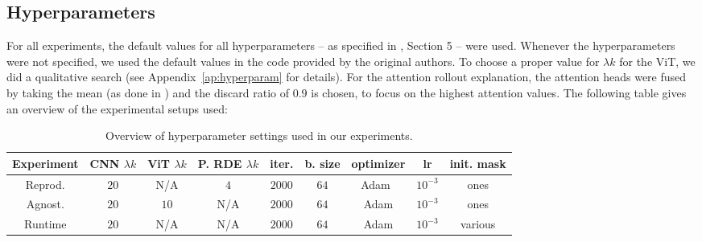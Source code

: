 \subsection{Hyperparameters}

For all experiments, the default values for all hyperparameters -- as specified in \cite{cartoonX}, Section 5 -- were used.
Whenever the hyperparameters were not specified, we used the default values in the code provided by the original authors.
To choose a proper value for $\lambda k$ for the ViT, we did a qualitative search (see Appendix~\ref{ap:hyperparam} for details).
For the attention rollout explanation, the attention heads were fused by taking the mean (as done in \cite{abnar2020quantifying}) and the discard ratio of $0.9$ is chosen, to focus on the highest attention values.
The following table gives an overview of the experimental setups used:

\begin{table}[htb]
\centering
\footnotesize
\begin{tabular}{c||c|c|c|c|c|c|c|c}
     Experiment & CNN $\lambda k$ & ViT $\lambda k$ & P. RDE $\lambda k$ & iter. & b. size & optimizer & lr & init. mask\\
     \hline
    Reprod. & $20$ & N/A & $4$ & $2000$ & $64$ & Adam~\cite{kingma2014adam} & $10^{-3}$ & ones \\
    Agnost. & $20$ & $10$ & N/A & $2000$ & $64$ & Adam & $10^{-3}$ & ones\\
    Runtime & $20$ & N/A & N/A & $2000$ & $64$ & Adam & $10^{-3}$ & various\\
\end{tabular}
\vspace{-2mm}
\caption{\footnotesize Overview of hyperparameter settings used in our experiments.}
\label{tab:my_label}
\end{table}
\vspace{-6mm}

